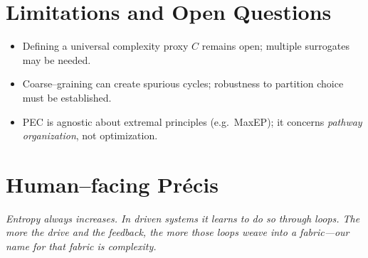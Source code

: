 \documentclass[12pt,a4paper]{article}
\begin{document}
\section{Limitations and Open Questions}
\begin{itemize}
\item Defining a universal complexity proxy $C$ remains open; multiple surrogates may be needed.
\item Coarse--graining can create spurious cycles; robustness to partition choice must be established.
\item PEC is agnostic about extremal principles (e.g.\ MaxEP); it concerns \emph{pathway organization}, not optimization.
\end{itemize}

\section*{Human--facing Précis}
\emph{Entropy always increases. In driven systems it learns to do so through loops. The more the drive and the feedback, the more those loops weave into a fabric---our name for that fabric is complexity.}
\end{document}
